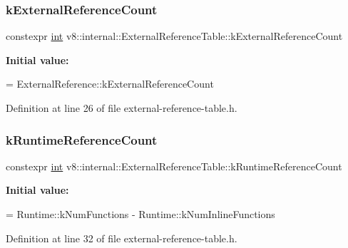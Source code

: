 \subsubsection{\texorpdfstring{k\+External\+Reference\+Count}{kExternalReferenceCount}}
{\footnotesize\ttfamily constexpr \mbox{\hyperlink{classint}{int}} v8\+::internal\+::\+External\+Reference\+Table\+::k\+External\+Reference\+Count\hspace{0.3cm}{\ttfamily [static]}}

{\bfseries Initial value\+:}
\begin{DoxyCode}
=
      ExternalReference::kExternalReferenceCount
\end{DoxyCode}


Definition at line 26 of file external-\/reference-\/table.\+h.

\mbox{\label{classv8_1_1internal_1_1ExternalReferenceTable_aa68d1a94201a9b4117d82da5f546246f}} 
\subsubsection{\texorpdfstring{k\+Runtime\+Reference\+Count}{kRuntimeReferenceCount}}
{\footnotesize\ttfamily constexpr \mbox{\hyperlink{classint}{int}} v8\+::internal\+::\+External\+Reference\+Table\+::k\+Runtime\+Reference\+Count\hspace{0.3cm}{\ttfamily [static]}}

{\bfseries Initial value\+:}
\begin{DoxyCode}
=
      Runtime::kNumFunctions -
      Runtime::kNumInlineFunctions
\end{DoxyCode}


Definition at line 32 of file external-\/reference-\/table.\+h.

\mbox{\label{classv8_1_1internal_1_1ExternalReferenceTable_a58e218e326f23cc501175f461edb9e6a}} 
